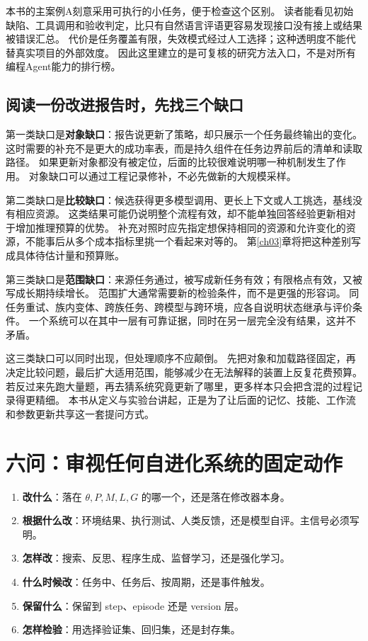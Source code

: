 本书的主案例A刻意采用可执行的小任务，便于检查这个区别。
读者能看见初始缺陷、工具调用和验收判定，比只有自然语言评语更容易发现接口没有接上或结果被错误汇总。
代价是任务覆盖有限，失效模式经过人工选择；这种透明度不能代替真实项目的外部效度。
因此这里建立的是可复核的研究方法入口，不是对所有编程Agent能力的排行榜。

\subsection{阅读一份改进报告时，先找三个缺口}

第一类缺口是\textbf{对象缺口}：报告说更新了策略，却只展示一个任务最终输出的变化。
这时需要的补充不是更大的成功率表，而是持久组件在任务边界前后的清单和读取路径。
如果更新对象都没有被定位，后面的比较很难说明哪一种机制发生了作用。
对象缺口可以通过工程记录修补，不必先做新的大规模采样。

第二类缺口是\textbf{比较缺口}：候选获得更多模型调用、更长上下文或人工挑选，基线没有相应资源。
这类结果可能仍说明整个流程有效，却不能单独回答经验更新相对于增加推理预算的优势。
补充对照时应先指定想保持相同的资源和允许变化的资源，不能事后从多个成本指标里挑一个看起来对等的。
第\ref{ch03}章将把这种差别写成具体待估计量和预算账。

第三类缺口是\textbf{范围缺口}：来源任务通过，被写成新任务有效；有限格点有效，又被写成长期持续增长。
范围扩大通常需要新的检验条件，而不是更强的形容词。
同任务重试、族内变体、跨族任务、跨模型与跨环境，应各自说明状态继承与评价条件。
一个系统可以在其中一层有可靠证据，同时在另一层完全没有结果，这并不矛盾。

这三类缺口可以同时出现，但处理顺序不应颠倒。
先把对象和加载路径固定，再决定比较问题，最后扩大适用范围，能够减少在无法解释的装置上反复花费预算。
若反过来先跑大量题，再去猜系统究竟更新了哪里，更多样本只会把含混的过程记录得更精细。
本书从定义与实验台讲起，正是为了让后面的记忆、技能、工作流和参数更新共享这一套提问方式。


\section{六问：审视任何自进化系统的固定动作}
\label{sec:sixq}

\begin{enumerate}[label=Q\arabic*.]
  \item \textbf{改什么}：落在 $\theta,P,M,L,G$ 的哪一个，还是落在修改器本身。
  \item \textbf{根据什么改}：环境结果、执行测试、人类反馈，还是模型自评。主信号必须写明。
  \item \textbf{怎样改}：搜索、反思、程序生成、监督学习，还是强化学习。
  \item \textbf{什么时候改}：任务中、任务后、按周期，还是事件触发。
  \item \textbf{保留什么}：保留到 step、episode 还是 version 层。
  \item \textbf{怎样检验}：用选择验证集、回归集，还是封存集。
\end{enumerate}

